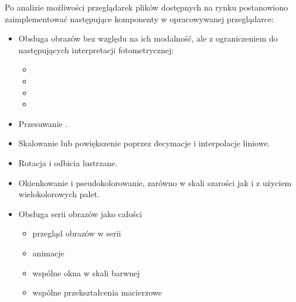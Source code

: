 
\par
Po analizie możliwości przeglądarek plików \DICOM dostępnych na rynku postanowiono zaimplementować następujące komponenty w opracowywanej przeglądarce:
\begin{itemize}
    \item Obsługa obrazów bez względu na ich modalność, ale z ograniczeniem do następujących interpretacji fotometrycznej:

          \begin{itemize}
              \item {}
              \item {}
              \item {}
              \item {}
          \end{itemize}

    \item Przesuwanie .

    \item Skalowanie lub powiększenie poprzez decymacje i interpolacje liniowe.

    \item Rotacja i odbicia lustrzane.

    \item Okienkowanie i pseudokolorowanie, zarówno w skali szarości jak i z użyciem wielokolorowych palet.

    \item Obsługa serii obrazów jako całości
          \begin{itemize}
              \item przegląd obrazów w serii
              \item animacje
              \item wspólne okna w skali barwnej
              \item wspólne przekształcenia macierzowe
          \end{itemize}
\end{itemize}
